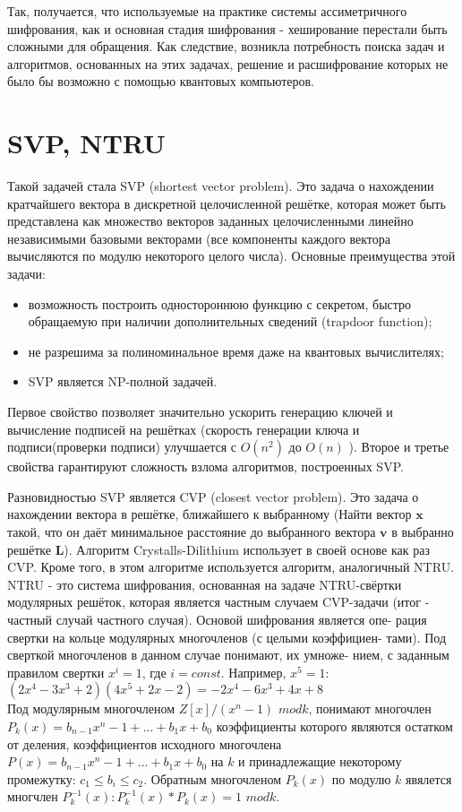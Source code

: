 \documentclass{article}
\begin{document}
	Так, получается, что используемые на практике системы ассиметричного шифрования, как и основная стадия шифрования - хеширование перестали быть сложными для обращения. Как следствие, возникла потребность поиска задач и алгоритмов, основанных на этих задачах, решение и расшифрование которых не было бы возможно с помощью квантовых компьютеров.
	
	\section{
			SVP, NTRU
	}
	Такой задачей стала SVP (shortest vector problem). Это задача о нахождении кратчайшего вектора в дискретной целочисленной решётке, которая может быть представлена как множество векторов заданных целочисленными линейно независимыми базовыми векторами (все компоненты каждого вектора вычисляются по модулю некоторого целого числа). Основные преимущества этой задачи:
	\begin{itemize}
		\item возможность построить одностороннюю функцию с секретом, быстро обращаемую при наличии дополнительных сведений (trapdoor function);
		\item не разрешима за полиноминальное время даже на квантовых вычислителях;
		\item SVP является NP-полной задачей.
	\end{itemize}

	Первое свойство позволяет значительно ускорить генерацию ключей и вычисление подписей на решётках (скорость генерации ключа и подписи(проверки подписи) улучшается с $O(n^2)$ до $O(n)$ ). Второе и третье свойства гарантируют сложность взлома алгоритмов, построенных SVP.
	
	Разновидностью SVP является CVP (closest vector problem). Это задача о нахождении вектора в решётке, ближайшего к выбранному (Найти вектор $\boldsymbol{x}$ такой, что он даёт  минимальное расстояние до выбранного вектора $\boldsymbol{v}$ в выбранно решётке $\boldsymbol{L}$).
	Алгоритм Crystalls-Dilithium использует в своей основе как раз CVP. Кроме того, в этом алгоритме используется алгоритм, аналогичный NTRU.\\
	
	NTRU - это система шифрования, основанная на задаче NTRU-свёртки модулярных решёток, которая является частным случаем CVP-задачи (итог - частный случай частного случая). Основой шифрования является опе-
	рация свертки на кольце модулярных многочленов (с целыми коэффициен-
	тами). Под сверткой многочленов в данном случае понимают, их умноже-
	нием, с заданным правилом свертки $x^i=1$, где $i=const$. Например, $x^5=1$:
	$(2x^4-3x^3+2)(4x^5+2x-2)=-2x^4-6x^3+4x+8$\\
	Под модулярным многочленом $Z[x]/(x^n-1)$ $modk$, понимают многочлен $P_{k}(x)=b_{n-1}x^n-1+...+b_{1}x+b_{0}$ коэффициенты которого являются остатком
	от деления, коэффициентов исходного многочлена \\
	$P(x)=b_{n-1}x^n-1+...+b_{1}x+b_{0}$ на $k$ и принадлежащие некоторому промежутку: $c_{1} \leq b_{i} \leq c_{2}$. Обратным многочленом $P_{k}(x)$ по модулю $k$ явялется многчлен $P_{k}^{-1}(x) : P_{k}^{-1}(x) * P_{k}(x) = 1$ $modk$.
	
\end{document}
